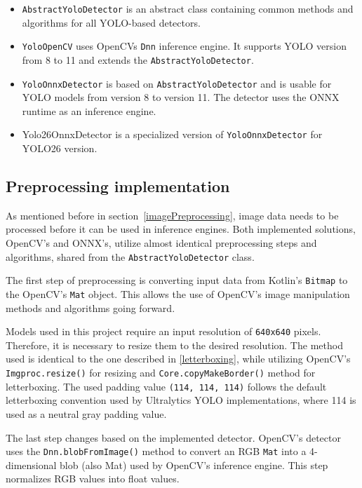 \begin{itemize}
  \item {\texttt{AbstractYoloDetector} is an abstract class containing common methods and algorithms for all YOLO-based detectors.}
  \item{\texttt{YoloOpenCV} uses OpenCVs \texttt{Dnn} inference engine. It supports YOLO version from 8 to 11 and extends the \texttt{AbstractYoloDetector}.}
  \item {\texttt{YoloOnnxDetector} is based on \texttt{AbstractYoloDetector} and is usable for YOLO models from version 8 to version 11. The detector uses the ONNX runtime as an inference engine.}
  \item {Yolo26OnnxDetector is a specialized version of \texttt{YoloOnnxDetector} for YOLO26 version.}
\end{itemize}
\bigskip


\subsection{Preprocessing implementation}
As mentioned before in section~\ref{imagePreprocessing}, image data needs to be processed before it can be used in inference engines. Both implemented solutions, OpenCV's and ONNX's, utilize almost identical preprocessing steps and algorithms, shared from the \texttt{AbstractYoloDetector} class.

The first step of preprocessing is converting input data from Kotlin's \texttt{Bitmap} to the OpenCV's \texttt{Mat} object. This allows the use of OpenCV's image manipulation methods and algorithms going forward. 

Models used in this project require an input resolution of \texttt{640x640} pixels. Therefore, it is necessary to resize them to the desired resolution. The method used is identical to the one described in \ref{letterboxing}, while utilizing OpenCV's \texttt{Imgproc.resize()} for resizing and \texttt{Core.copyMakeBorder()} method for letterboxing. The used padding value \texttt{(114, 114, 114)} follows the default letterboxing convention used by Ultralytics YOLO implementations, where 114 is used as a neutral gray padding value.

The last step changes based on the implemented detector. OpenCV's detector uses the \texttt{Dnn.blobFromImage()} method to convert an RGB \texttt{Mat} into a 4-dimensional blob (also Mat) used by OpenCV's inference engine. This step normalizes RGB values into float values.

